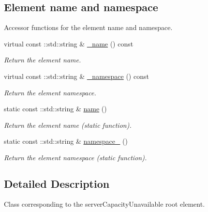 \subsection*{Element name and namespace}
\label{_amgrpd4b5b61f6e07390f4af2465e04571f34}
Accessor functions for the element name and namespace. \begin{DoxyCompactItemize}
\item 
virtual const ::std::string \& \hyperlink{classopenstack_1_1xml_1_1ServerCapacityUnavailable_ad48526dedb865b2bfa9bb21c4bad091d}{\_\-name} () const 
\begin{DoxyCompactList}\small\item\em Return the element name. \item\end{DoxyCompactList}\item 
virtual const ::std::string \& \hyperlink{classopenstack_1_1xml_1_1ServerCapacityUnavailable_ab687973b5adb61c723389e4a1c972653}{\_\-namespace} () const 
\begin{DoxyCompactList}\small\item\em Return the element namespace. \item\end{DoxyCompactList}\item 
static const ::std::string \& \hyperlink{classopenstack_1_1xml_1_1ServerCapacityUnavailable_a7439b021daab375e291a040ed0df871d}{name} ()
\begin{DoxyCompactList}\small\item\em Return the element name (static function). \item\end{DoxyCompactList}\item 
static const ::std::string \& \hyperlink{classopenstack_1_1xml_1_1ServerCapacityUnavailable_ab5233e7a6c24d9bc8ed114eb2e9574f8}{namespace\_\-} ()
\begin{DoxyCompactList}\small\item\em Return the element namespace (static function). \item\end{DoxyCompactList}\end{DoxyCompactItemize}


\subsection{Detailed Description}
Class corresponding to the serverCapacityUnavailable root element. 

